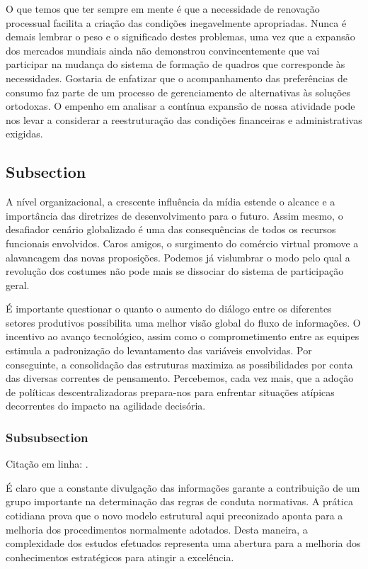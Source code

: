 \documentclass[a4paper,12pt]{udesc}
\begin{document}
          O que temos que ter sempre em mente é que a necessidade de renovação processual facilita a criação das condições inegavelmente apropriadas. Nunca é demais lembrar o peso e o significado destes problemas, uma vez que a expansão dos mercados mundiais ainda não demonstrou convincentemente que vai participar na mudança do sistema de formação de quadros que corresponde às necessidades. Gostaria de enfatizar que o acompanhamento das preferências de consumo faz parte de um processo de gerenciamento de alternativas às soluções ortodoxas. O empenho em analisar a contínua expansão de nossa atividade pode nos levar a considerar a reestruturação das condições financeiras e administrativas exigidas. 


\subsection{Subsection}

          A nível organizacional, a crescente influência da mídia estende o alcance e a importância das diretrizes de desenvolvimento para o futuro. Assim mesmo, o desafiador cenário globalizado é uma das consequências de todos os recursos funcionais envolvidos. Caros amigos, o surgimento do comércio virtual promove a alavancagem das novas proposições. Podemos já vislumbrar o modo pelo qual a revolução dos costumes não pode mais se dissociar do sistema de participação geral. 

          É importante questionar o quanto o aumento do diálogo entre os diferentes setores produtivos possibilita uma melhor visão global do fluxo de informações. O incentivo ao avanço tecnológico, assim como o comprometimento entre as equipes estimula a padronização do levantamento das variáveis envolvidas. Por conseguinte, a consolidação das estruturas maximiza as possibilidades por conta das diversas correntes de pensamento. Percebemos, cada vez mais, que a adoção de políticas descentralizadoras prepara-nos para enfrentar situações atípicas decorrentes do impacto na agilidade decisória. 

\subsubsection{Subsubsection}

Citação em linha: .

\cite{MQ04}
\cite{lopes2012dissertacao}
\cite{CL89}

          É claro que a constante divulgação das informações garante a contribuição de um grupo importante na determinação das regras de conduta normativas. A prática cotidiana prova que o novo modelo estrutural aqui preconizado aponta para a melhoria dos procedimentos normalmente adotados. Desta maneira, a complexidade dos estudos efetuados representa uma abertura para a melhoria dos conhecimentos estratégicos para atingir a excelência. 
\end{document}
